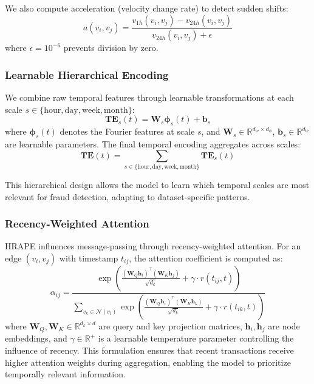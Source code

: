 We also compute acceleration (velocity change rate) to detect sudden shifts:
\begin{equation}
    a(v_i, v_j) = \frac{v_{1h}(v_i, v_j) - v_{24h}(v_i, v_j)}{v_{24h}(v_i, v_j) + \epsilon}
\end{equation}
where $\epsilon = 10^{-6}$ prevents division by zero.

\subsubsection{Learnable Hierarchical Encoding}

We combine raw temporal features through learnable transformations at each scale $s \in \{\text{hour}, \text{day}, \text{week}, \text{month}\}$:
\begin{equation}
    \mathbf{TE}_s(t) = \mathbf{W}_s \boldsymbol{\phi}_s(t) + \mathbf{b}_s
\end{equation}
where $\boldsymbol{\phi}_s(t)$ denotes the Fourier features at scale $s$, and $\mathbf{W}_s \in \mathbb{R}^{d_{\text{te}} \times d_\phi}$, $\mathbf{b}_s \in \mathbb{R}^{d_{\text{te}}}$ are learnable parameters. The final temporal encoding aggregates across scales:
\begin{equation}
    \mathbf{TE}(t) = \sum_{s \in \{\text{hour}, \text{day}, \text{week}, \text{month}\}} \mathbf{TE}_s(t)
\end{equation}

This hierarchical design allows the model to learn which temporal scales are most relevant for fraud detection, adapting to dataset-specific patterns.

\subsubsection{Recency-Weighted Attention}

HRAPE influences message-passing through recency-weighted attention. For an edge $(v_i, v_j)$ with timestamp $t_{ij}$, the attention coefficient is computed as:
\begin{equation}
    \alpha_{ij} = \frac{\exp\left(\frac{(\mathbf{W}_Q \mathbf{h}_i)^\top (\mathbf{W}_K \mathbf{h}_j)}{\sqrt{d_k}} + \gamma \cdot r(t_{ij}, t)\right)}{\sum_{v_k \in \mathcal{N}(v_i)} \exp\left(\frac{(\mathbf{W}_Q \mathbf{h}_i)^\top (\mathbf{W}_K \mathbf{h}_k)}{\sqrt{d_k}} + \gamma \cdot r(t_{ik}, t)\right)}
\end{equation}
where $\mathbf{W}_Q, \mathbf{W}_K \in \mathbb{R}^{d_k \times d}$ are query and key projection matrices, $\mathbf{h}_i, \mathbf{h}_j$ are node embeddings, and $\gamma \in \mathbb{R}^+$ is a learnable temperature parameter controlling the influence of recency. This formulation ensures that recent transactions receive higher attention weights during aggregation, enabling the model to prioritize temporally relevant information.

